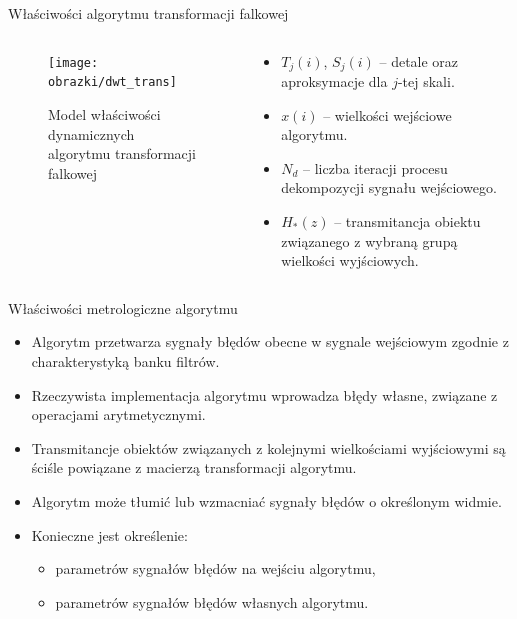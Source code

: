 \documentclass[12pt, polish, aspectratio = 169]{slides}
\begin{document}
\begin{frame}{Właściwości algorytmu transformacji falkowej}
\begin{columns}
\begin{column}{0.5\textwidth}
	\begin{figure}
	\texttt{[image: obrazki/dwt\_trans]}
	\caption{Model właściwości dynamicznych algorytmu transformacji falkowej}
	\end{figure}
\end{column}
\begin{column}{0.5\textwidth}
	\begin{itemize}
	\item $T_{j}(i)$, $S_{j}(i)$ -- detale oraz aproksymacje dla $j$-tej skali.
	\item $x(i)$ -- wielkości wejściowe algorytmu.
	\item $N_{d}$ -- liczba iteracji procesu dekompozycji sygnału wejściowego.
	\item $H_{*}(z)$ -- transmitancja obiektu związanego z wybraną grupą wielkości wyjściowych.
	\end{itemize}
\end{column}
\end{columns}
\end{frame}

\begin{frame}{Właściwości metrologiczne algorytmu}
\begin{itemize}
\item Algorytm przetwarza sygnały błędów obecne w sygnale wejściowym zgodnie z charakterystyką banku filtrów.
\item Rzeczywista implementacja algorytmu wprowadza błędy własne, związane z operacjami arytmetycznymi.
\item Transmitancje obiektów związanych z kolejnymi wielkościami wyjściowymi są ściśle powiązane z macierzą transformacji algorytmu.
\item Algorytm może tłumić lub wzmacniać sygnały błędów o określonym widmie.
\item Konieczne jest określenie:
	\begin{itemize}
	\item parametrów sygnałów błędów na wejściu algorytmu,
	\item parametrów sygnałów błędów własnych algorytmu.
	\end{itemize}
\end{itemize}
\end{frame}
\end{document}
